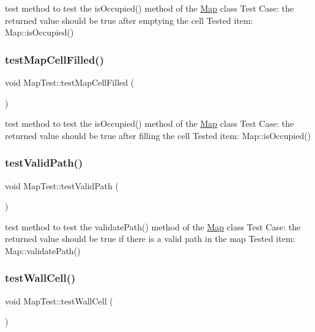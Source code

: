 test method to test the is\+Occupied() method of the \hyperlink{classMap}{Map} class Test Case\+: the returned value should be true after emptying the cell Tested item\+: Map\+::is\+Occupied() \hypertarget{classMapTest_a07e1aa96435351d15809b880ff7a7efb}{}\label{classMapTest_a07e1aa96435351d15809b880ff7a7efb} 
\subsubsection{\texorpdfstring{test\+Map\+Cell\+Filled()}{testMapCellFilled()}}
{\footnotesize\ttfamily void Map\+Test\+::test\+Map\+Cell\+Filled (\begin{DoxyParamCaption}{ }\end{DoxyParamCaption})\hspace{0.3cm}{\ttfamily [protected]}}

test method to test the is\+Occupied() method of the \hyperlink{classMap}{Map} class Test Case\+: the returned value should be true after filling the cell Tested item\+: Map\+::is\+Occupied() \hypertarget{classMapTest_ae7a28d196c97101aa248a326af2a3f5b}{}\label{classMapTest_ae7a28d196c97101aa248a326af2a3f5b} 
\subsubsection{\texorpdfstring{test\+Valid\+Path()}{testValidPath()}}
{\footnotesize\ttfamily void Map\+Test\+::test\+Valid\+Path (\begin{DoxyParamCaption}{ }\end{DoxyParamCaption})\hspace{0.3cm}{\ttfamily [protected]}}

test method to test the validate\+Path() method of the \hyperlink{classMap}{Map} class Test Case\+: the returned value should be true if there is a valid path in the map Tested item\+: Map\+::validate\+Path() \hypertarget{classMapTest_a577057c71af12efac9f1d6878bf85d01}{}\label{classMapTest_a577057c71af12efac9f1d6878bf85d01} 
\subsubsection{\texorpdfstring{test\+Wall\+Cell()}{testWallCell()}}
{\footnotesize\ttfamily void Map\+Test\+::test\+Wall\+Cell (\begin{DoxyParamCaption}{ }\end{DoxyParamCaption})\hspace{0.3cm}{\ttfamily [protected]}}

